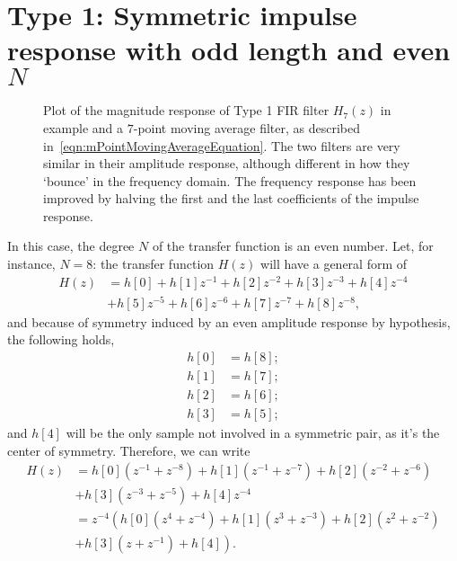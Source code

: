 \documentclass[\documentfontsize, twocolumn]{\classname}
\begin{document}
\section{Type 1: Symmetric impulse response with odd length and even $N$}

\begin{figure*}[ht]
\begin{center}
\scalebox{0.45}{
    
}\caption{Plot of the magnitude response of Type 1 FIR filter $H_7(z)$ in example and a $7$-point moving average filter, as described in~\ref{eqn:mPointMovingAverageEquation}. The two filters are very similar in their amplitude response, although different in how they `bounce' in the frequency domain. The frequency response has been improved by halving the first and the last coefficients of the impulse response.}\label{oct:typeI}
\end{center}
\end{figure*}

In this case, the degree $N$ of the transfer function is an even number. Let, for instance, $N=8$: the transfer function $H(z)$ will have a general form of
\begin{align*}
    H(z) &= h[0]
        + h[1]z^{-1}
        + h[2]z^{-2}
        + h[3]z^{-3}
        + h[4]z^{-4}\\
        & + h[5]z^{-5}
        + h[6]z^{-6}
        + h[7]z^{-7}
        + h[8]z^{-8},
\end{align*}
and because of symmetry induced by an even amplitude response by hypothesis, the following holds,
\begin{align*}
    h[0] &= h[8];\\
    h[1] &= h[7];\\
    h[2] &= h[6];\\
    h[3] &= h[5];
\end{align*}
and $h[4]$ will be the only sample not involved in a symmetric pair, as it's the center of symmetry. Therefore, we can write
\begin{align*}
    H(z) &= h[0](z^{-1} + z^{-8})
        + h[1](z^{-1} + z^{-7})
        + h[2](z^{-2} + z^{-6})\\
        & + h[3](z^{-3} + z^{-5})
        + h[4]z^{-4}\\
         &= z^{-4}\left(h[0](z^{4} + z^{-4})
        + h[1](z^{3} + z^{-3})
        + h[2](z^{2} + z^{-2})\right.\\
        & \left.+ h[3](z + z^{-1})
        + h[4]\right).
\end{align*}
\end{document}
